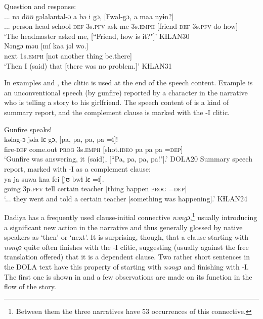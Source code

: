 \documentclass[output=paper]{langscibook}
\begin{document}
\ea Question and response:
\label{ex:dettweiler:KƗLAN30} \\
\gll ... nə dʊʊ gəlalantal-ɔ a bə i gɔ, [Fwal-gɔ, a maa nyɨn?] \\
... person head school-\textsc{def} 3s.\textsc{pfv} ask me 3s.\textsc{emph} [friend-\textsc{def} 3s.\textsc{pfv} do how] \\
\glt `The headmaster asked me, [``Friend, how is it?"]' KƗLAN30 \\
\gll Nəngɔ məu [mí kaa jəl wo.] \\
next 1s.\textsc{emph} [not another thing be.there] \\
\glt `Then I (said) that [there was no problem.]' KƗLAN31
\z

\noindent In examples  and , the clitic is used at the end of the speech content. Example  is an unconventional speech (by gunfire) reported by a character in the narrative who is telling a story to his girlfriend. The speech content of  is a kind of summary report, and the complement clause is marked with the -I clitic.

\ea Gunfire speaks!
\label{ex:dettweiler:DOLA20} \\
\gll kəlag-ɔ jəla lɛ gɔ, [pa, pa, pa, pa =ɨ]! \\
fire-\textsc{def} come.out \textsc{prog} 3s.\textsc{emph} [shot.\textsc{ideo} pa pa pa =\textsc{dep}] \\
\glt `Gunfire was answering, it (said), [``Pa, pa, pa, pa!"].' DOLA20
\ex Summary speech report, marked with -I as a complement clause:
\label{ex:dettweiler:KƗLAN24} \\
\gll ya ja suwa kaa fei [jʊ bwɨ lɛ =ɨ]. \\
going 3p.\textsc{pfv} tell certain teacher [thing happen \textsc{prog} =\textsc{dep}] \\
\glt `... they went and told a certain teacher [something was happening].' KƗLAN24
\z

\noindent Dadiya has a frequently used clause-initial connective \textit{nəngɔ},\footnote{Between them the three narratives have 53 occurrences of this connective.}  usually introducing a significant new action in the narrative and thus generally glossed by native speakers as `then' or `next'. It is surprising, though, that a clause starting with \textit{nəngɔ} quite often finishes with the -I clitic, suggesting (usually against the free translation offered) that it is a dependent clause. Two rather short sentences in the DOLA text have this property of starting with \textit{nəngɔ} and finishing with -I. The first one is shown in  and a few observations are made on its function in the flow of the story.
\end{document}
